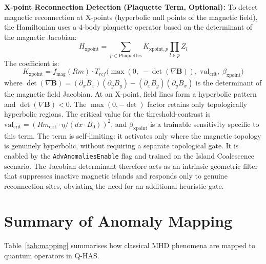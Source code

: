 \documentclass[12pt, a4paper, oneside]{report}
\begin{document}
\textbf{X-point Reconnection Detection (Plaquette Term, Optional):}
To detect magnetic reconnection at X-points (hyperbolic null points of the magnetic field), the Hamiltonian uses a 4-body plaquette operator based on the determinant of the magnetic Jacobian:
\begin{equation}
    H_{\text{xpoint}} = \sum_{p \in \text{Plaquettes}} K_{\text{xpoint},p} \prod_{l \in p} Z_l
\end{equation}
The coefficient is:
\begin{equation}
    K_{\text{xpoint}} = f_{\text{mag}}(Rm) \cdot T_{rcf}\!\bigl(\max(0,\; -\det(\nabla \mathbf{B})),\; \text{val}_{\text{crit}},\; \beta_{\text{xpoint}}\bigr)
\end{equation}
where $\det(\nabla \mathbf{B}) = (\partial_x B_x)(\partial_y B_y) - (\partial_x B_y)(\partial_y B_x)$ is the determinant of the magnetic field Jacobian. At an X-point, field lines form a hyperbolic pattern and $\det(\nabla \mathbf{B}) < 0$. The $\max(0, -\det)$ factor retains only topologically hyperbolic regions. The critical value for the threshold-contrast is $\text{val}_{\text{crit}} = (Rm_{\text{crit}} \cdot \eta / (dx \cdot B_0))^2$, and $\beta_{\text{xpoint}}$ is a trainable sensitivity specific to this term. The term is self-limiting: it activates only where the magnetic topology is genuinely hyperbolic, without requiring a separate topological gate. It is enabled by the \texttt{AdvAnomaliesEnable} flag and trained on the Island Coalescence scenario. The Jacobian determinant therefore acts as an intrinsic geometric filter that suppresses inactive magnetic islands and responds only to genuine reconnection sites, obviating the need for an additional heuristic gate.


\section{Summary of Anomaly Mapping}
Table~\ref{tab:mapping} summarises how classical MHD phenomena are mapped to quantum operators in Q-HAS.
\end{document}
